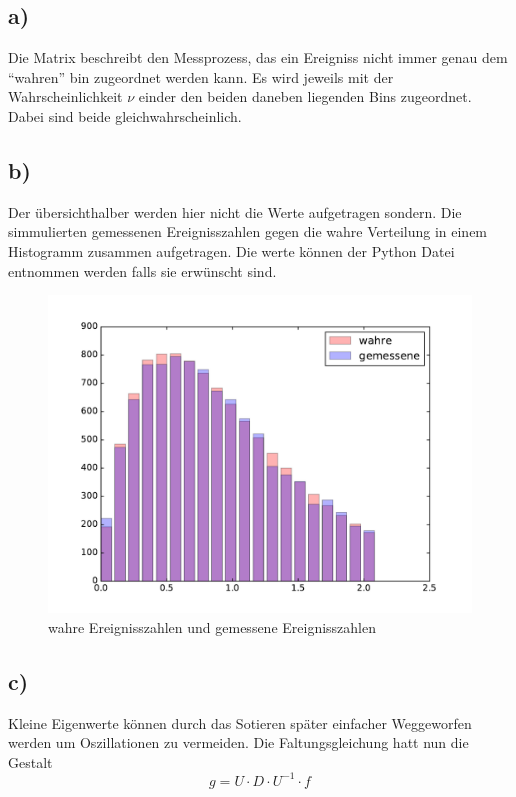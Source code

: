 \subsection*{a)}
Die Matrix beschreibt den Messprozess, das ein Ereigniss nicht immer genau dem ``wahren'' bin zugeordnet werden kann. Es wird jeweils mit der Wahrscheinlichkeit $\nu$ einder den beiden daneben liegenden Bins zugeordnet. Dabei sind beide gleichwahrscheinlich.
\subsection*{b)}
Der übersichthalber werden hier nicht die Werte aufgetragen sondern. Die simmulierten gemessenen Ereignisszahlen gegen die wahre Verteilung in einem Histogramm zusammen aufgetragen. Die werte können der Python Datei entnommen werden falls sie erwünscht sind. 
\begin{figure}[H]
  \centering
  \includegraphics[width=\textwidth]{./Python/gemesseneVerteilung.pdf}
  \caption{wahre Ereignisszahlen und gemessene Ereignisszahlen}
\end{figure}
\subsection*{c)}
Kleine Eigenwerte können durch das Sotieren später einfacher Weggeworfen werden um Oszillationen zu vermeiden. Die Faltungsgleichung hatt nun die Gestalt 
\begin{equation}
  g = U \cdot D \cdot U^{-1} \cdot f
\end{equation}

